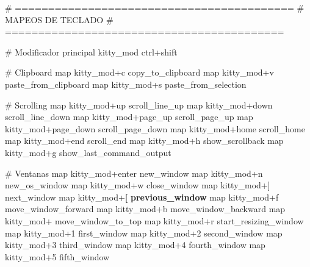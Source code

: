 \documentclass[
  doc,
  floatsintext,
  longtable,
  a4paper,
  nolmodern,
  notxfonts,
  notimes,
  12pt,
  colorlinks=true,linkcolor=blue,citecolor=blue,urlcolor=blue]{apa7}
\newenvironment{Shaded}{\begin{snugshade}}{\end{snugshade}}
\newcommand{\CommentTok}[1]{\textcolor[rgb]{0.37,0.37,0.37}{#1}}
\newcommand{\DataTypeTok}[1]{\textcolor[rgb]{0.68,0.00,0.00}{#1}}
\newcommand{\ErrorTok}[1]{\textcolor[rgb]{0.68,0.00,0.00}{#1}}
\newcommand{\KeywordTok}[1]{\textcolor[rgb]{0.00,0.23,0.31}{\textbf{#1}}}
\begin{document}
\begin{Shaded}
\begin{Highlighting}[]
\CommentTok{\# ==========================================}
\CommentTok{\# MAPEOS DE TECLADO}
\CommentTok{\# ==========================================}

\CommentTok{\# Modificador principal}
\DataTypeTok{kitty\_mod} \DataTypeTok{ctrl}\ErrorTok{+}\DataTypeTok{shift}

\CommentTok{\# Clipboard}
\DataTypeTok{map} \DataTypeTok{kitty\_mod}\ErrorTok{+}\DataTypeTok{c} \DataTypeTok{copy\_to\_clipboard}
\DataTypeTok{map} \DataTypeTok{kitty\_mod}\ErrorTok{+}\DataTypeTok{v} \DataTypeTok{paste\_from\_clipboard}
\DataTypeTok{map} \DataTypeTok{kitty\_mod}\ErrorTok{+}\DataTypeTok{s} \DataTypeTok{paste\_from\_selection}

\CommentTok{\# Scrolling}
\DataTypeTok{map} \DataTypeTok{kitty\_mod}\ErrorTok{+}\DataTypeTok{up} \DataTypeTok{scroll\_line\_up}
\DataTypeTok{map} \DataTypeTok{kitty\_mod}\ErrorTok{+}\DataTypeTok{down} \DataTypeTok{scroll\_line\_down}
\DataTypeTok{map} \DataTypeTok{kitty\_mod}\ErrorTok{+}\DataTypeTok{page\_up} \DataTypeTok{scroll\_page\_up}
\DataTypeTok{map} \DataTypeTok{kitty\_mod}\ErrorTok{+}\DataTypeTok{page\_down} \DataTypeTok{scroll\_page\_down}
\DataTypeTok{map} \DataTypeTok{kitty\_mod}\ErrorTok{+}\DataTypeTok{home} \DataTypeTok{scroll\_home}
\DataTypeTok{map} \DataTypeTok{kitty\_mod}\ErrorTok{+}\DataTypeTok{end} \DataTypeTok{scroll\_end}
\DataTypeTok{map} \DataTypeTok{kitty\_mod}\ErrorTok{+}\DataTypeTok{h} \DataTypeTok{show\_scrollback}
\DataTypeTok{map} \DataTypeTok{kitty\_mod}\ErrorTok{+}\DataTypeTok{g} \DataTypeTok{show\_last\_command\_output}

\CommentTok{\# Ventanas}
\DataTypeTok{map} \DataTypeTok{kitty\_mod}\ErrorTok{+}\DataTypeTok{enter} \DataTypeTok{new\_window}
\DataTypeTok{map} \DataTypeTok{kitty\_mod}\ErrorTok{+}\DataTypeTok{n} \DataTypeTok{new\_os\_window}
\DataTypeTok{map} \DataTypeTok{kitty\_mod}\ErrorTok{+}\DataTypeTok{w} \DataTypeTok{close\_window}
\DataTypeTok{map} \DataTypeTok{kitty\_mod}\ErrorTok{+]} \DataTypeTok{next\_window}
\DataTypeTok{map} \DataTypeTok{kitty\_mod}\ErrorTok{+}\KeywordTok{[} \KeywordTok{previous\_window}
\DataTypeTok{map} \DataTypeTok{kitty\_mod}\ErrorTok{+}\DataTypeTok{f} \DataTypeTok{move\_window\_forward}
\DataTypeTok{map} \DataTypeTok{kitty\_mod}\ErrorTok{+}\DataTypeTok{b} \DataTypeTok{move\_window\_backward}
\DataTypeTok{map} \DataTypeTok{kitty\_mod}\ErrorTok{+\textasciigrave{}} \DataTypeTok{move\_window\_to\_top}
\DataTypeTok{map} \DataTypeTok{kitty\_mod}\ErrorTok{+}\DataTypeTok{r} \DataTypeTok{start\_resizing\_window}
\DataTypeTok{map} \DataTypeTok{kitty\_mod}\ErrorTok{+}\DataTypeTok{1} \DataTypeTok{first\_window}
\DataTypeTok{map} \DataTypeTok{kitty\_mod}\ErrorTok{+}\DataTypeTok{2} \DataTypeTok{second\_window}
\DataTypeTok{map} \DataTypeTok{kitty\_mod}\ErrorTok{+}\DataTypeTok{3} \DataTypeTok{third\_window}
\DataTypeTok{map} \DataTypeTok{kitty\_mod}\ErrorTok{+}\DataTypeTok{4} \DataTypeTok{fourth\_window}
\DataTypeTok{map} \DataTypeTok{kitty\_mod}\ErrorTok{+}\DataTypeTok{5} \DataTypeTok{fifth\_window}


\end{Highlighting}
\end{Shaded}
\end{document}
